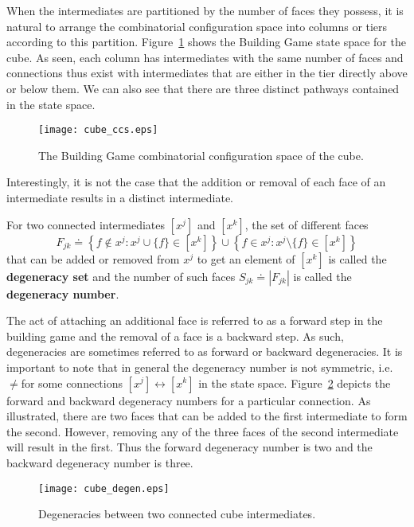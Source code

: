 When the intermediates are partitioned by the number of faces they possess, it is natural to arrange the combinatorial configuration space into columns or tiers according to this partition. Figure~\ref{fig:CubeCCS} shows the Building Game state space for the cube. As seen, each column has intermediates with the same number of faces and connections thus exist with intermediates that are either in the tier directly above or below them. We can also see that there are three distinct pathways contained in the state space. 

\begin{figure}[ht]
\texttt{[image: cube\_ccs.eps]}
\caption{The Building Game combinatorial configuration space of the cube.}
\label{fig:CubeCCS}    
\end{figure}

Interestingly, it is not the case that the addition or removal of each face of an intermediate results in a distinct intermediate. 
\begin{mydef}
For two connected intermediates $[x^j]$ and $[x^k]$, the set of different faces $$F_{jk} \doteq \left\{f \notin x^j : x^j\cup\{f\} \in [x^k]\right\}\cup\left\{f \in x^j : x^j\setminus\{f\} \in [x^k]\right\}$$ that can be added or removed from $x^j$ to get an element of $[x^k]$ is called the \textbf{degeneracy set} and the number of such faces $S_{jk} \doteq \left|F_{jk}\right|$ is called the \textbf{degeneracy number}.
\end{mydef}

The act of attaching an additional face is referred to as a forward step in the building game and the removal of a face is a backward step. As such, degeneracies are sometimes referred to as forward or backward degeneracies. It is important to note that in general the degeneracy number is not symmetric, i.e. \Sjk$\neq$\Skj\spc for some connections $[x^j] \leftrightarrow [x^k]$ in the state space. Figure~\ref{fig:CubeDegen} depicts the forward and backward degeneracy numbers for a particular connection. As illustrated, there are two faces that can be added to the first intermediate to form the second. However, removing any of the three faces of the second intermediate will result in the first. Thus the forward degeneracy number is two and the backward degeneracy number is three.  


\begin{figure}[ht]
\texttt{[image: cube\_degen.eps]}
\caption{Degeneracies between two connected cube intermediates.}
\label{fig:CubeDegen}    
\end{figure}


